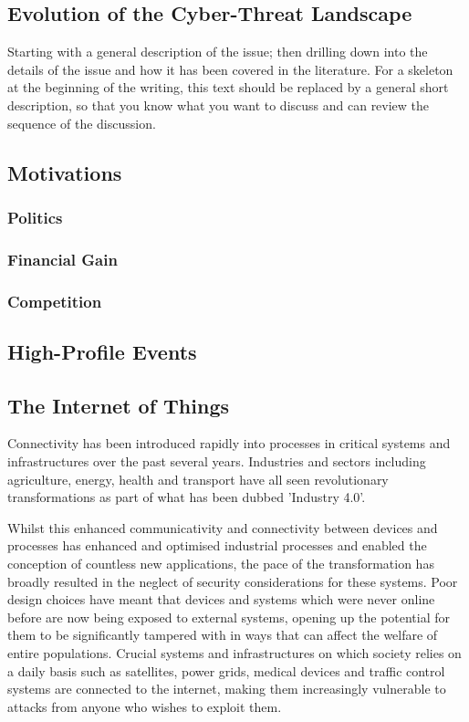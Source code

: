 \subsection{Evolution of the Cyber-Threat Landscape}

Starting with a general description of the issue; then drilling down into the details of the issue and how it has been covered in the literature. For a skeleton at the beginning of the writing, this text should be replaced by a general short description, so that you know what you want to discuss and can review the sequence of the discussion.

\subsection{Motivations}

\subsubsection{Politics}

\subsubsection{Financial Gain}

\subsubsection{Competition}

\subsection{High-Profile Events}

\subsection{The Internet of Things}

Connectivity has been introduced rapidly into processes in critical systems and infrastructures over the past several years. Industries and sectors including agriculture, energy, health and transport have all seen revolutionary transformations as part of what has been dubbed 'Industry 4.0'. 

Whilst this enhanced communicativity and connectivity between devices and processes has enhanced and optimised industrial processes and enabled the conception of countless new applications, the pace of the transformation has broadly resulted in the neglect of security considerations for these systems. Poor design choices have meant that devices and systems which were never online before are now being exposed to external systems, opening up the potential for them to be significantly tampered with in ways that can affect the welfare of entire populations.  Crucial systems and infrastructures on which society relies on a daily basis such as satellites, power grids, medical devices and traffic control systems are connected to the internet, making them increasingly vulnerable to attacks from anyone who wishes to exploit them.

